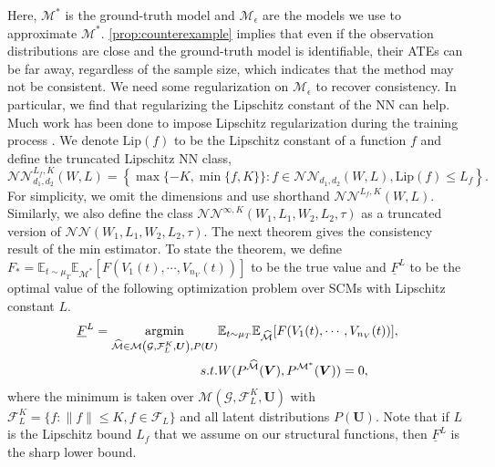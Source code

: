 \documentclass[12pt]{article}
\theoremstyle{plain}
\theoremstyle{definition}
\theoremstyle{remark}
\begin{document}
Here, $ \mathcal{M}^* $ is the ground-truth model and $\mathcal{M}_\epsilon$ are the models we use to approximate $\mathcal{M}^*$. \cref{prop:counterexample} implies that even if the observation distributions are close and the ground-truth model is identifiable, their ATEs can be far away, regardless of the sample size, which indicates that the method may not be consistent. We need some regularization on $\mathcal{M}_\epsilon$ to recover consistency. In particular, we find that regularizing the Lipschitz constant of the NN can help. Much work has been done to impose Lipschitz regularization during the training process \cite{cisse2017parseval,virmauxLipschitzRegularityDeep2018a,goukRegularisationNeuralNetworks2021,pauliTrainingRobustNeural2021,bungertCLIPCheapLipschitz2021}. We denote $ \text{Lip}( f)$ to be the Lipschitz constant of a function $ f$ and define the truncated Lipschitz NN class, 
\begin{equation*}
    \mathcal{NN}_{d_{1} ,d_{2}}^{{L_f},{K}}(W,L) =\left\{\max\{-K,\min\{f,K\}\}:f\in \mathcal{NN}_{d_{1} ,d_{2}}\left({W} ,L\right),\text{Lip}(f) \leqslant L_f\right\}.
\end{equation*}
 For simplicity, we omit the dimensions and use shorthand $  \mathcal{N}\mathcal{N}^{L_f,K}(W,L)$. Similarly, we also define the class  $\mathcal{NN}^{\infty,K}(W_1,L_1,W_2,L_2,\tau)$ as a truncated version of $\mathcal{NN}(W_1,L_1,W_2,L_2,\tau)$. The next theorem gives the consistency result of the min estimator. To state the theorem, we define $ F_{*} =\mathbb{E}_{t\sim \mu _{T}}\mathbb{E}_{\mathcal{M}^*}[ F( V_{1}( t) ,\cdots ,V_{n_{V}}( t))]$ to be the true value and $ \underline{F}^{L}$ to be the optimal value of the following optimization problem over SCMs with Lipschitz constant $L$.
\begin{align}
\underline{F}^{L} = \mathop{\mathrm{argmin}}_{\widehat{\mathcal{M}} \in \mathcal{M}\left(\mathcal{G} ,\mathcal{F}^K_{L} ,\boldsymbol{U}\right), P(\boldsymbol{U})} & \mathbb{E}_{t\sim \mu _{T}}\mathbb{E}_{\widehat{\mathcal{M}}}[ F( V_{1}( t) ,\cdots ,V_{n_{V}}( t))] , \label{eq:consistent_limiting}\\
s.t. & W( P^{\widehat{\mathcal{M}}}(\boldsymbol{V}) ,P^{\mathcal{M}^*}(\boldsymbol{V})) =0,\notag 
\end{align}
where the minimum is taken over $\mathcal{M}\left(\mathcal{G} ,\mathcal{F}^K_{L} ,\boldsymbol{U}\right)$ with $\mathcal{F}^K_{L} = \{f: \|f\|\leqslant K, f \in \mathcal{F}_{L}\} $ and all latent distributions $P(\boldsymbol{U})$. Note that if $L$ is the Lipschitz bound $L_f$ that we assume on our structural functions, then $\underline{{F}}^L$ is the sharp lower bound. 
\end{document}
